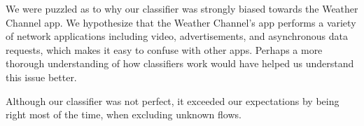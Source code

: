 \documentclass[a4paper, 11pt]{article} %
\begin{document}
We were puzzled as to why our classifier was strongly biased towards the Weather
Channel app. We hypothesize that the Weather Channel's app performs a variety of
network applications including video, advertisements, and asynchronous data
requests, which makes it easy to confuse with other apps. Perhaps a more
thorough understanding of how classifiers work would have helped us understand
this issue better.

Although our classifier was not perfect, it exceeded our expectations by being
right most of the time, when excluding unknown flows.
\end{document}
